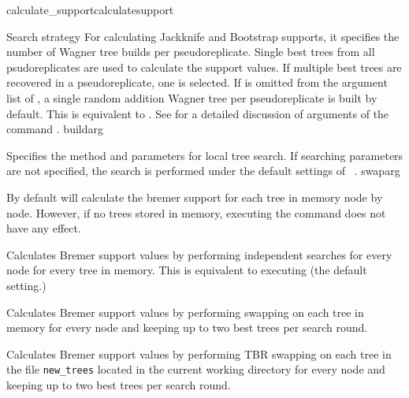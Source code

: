 \begin{command}{calculate\_support}{calculatesupport}
\begin{arguments}
\begin{argumentgroup}{Search strategy}
{             For calculating Jackknife
             and Bootstrap supports, it specifies the number of
             Wagner tree builds per pseudoreplicate.  Single best trees from all
             psudoreplicates are used to calculate the support values. If
             multiple best trees are recovered in a pseudoreplicate, one 
             is selected. If  is
             omitted from the argument list of ,
             a single random addition Wagner tree per
             pseudoreplicate is built by default. This is equivalent to 
             . See
              for a detailed discussion of
             arguments of the command .}
             {buildarg}

            {Specifies the method and parameters for local tree search. If searching
            parameters are not specified, the search is performed under
            the default settings of ~.} 
            {swaparg}
	     
        		\end{argumentgroup}

	\end{arguments}

    {By default \poy will calculate the bremer support for each tree in memory node by node.
    However, if no trees stored in memory, executing the command
     does not have any effect.}

	\begin{poyexamples} 

            {Calculates Bremer support values by performing
            independent searches for every node for every tree in memory. This is equivalent to executing  (the default setting.)}
         
            {Calculates Bremer support values by performing swapping on 
            each tree in memory for every node and keeping up to two
            best trees per search round.}
          
            {Calculates Bremer support values by performing TBR swapping on 
            each tree in the file \texttt{new\_trees} located in the current
            working directory for every node and keeping up to two
            best trees per search round.}  
            

\end{poyexamples}
\end{command}
